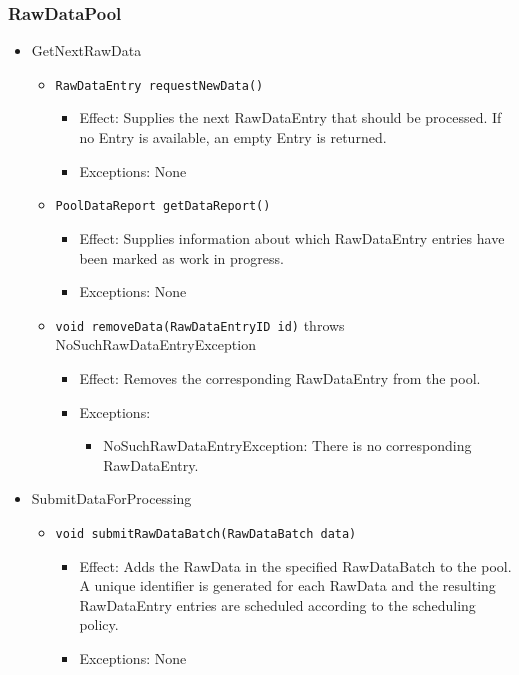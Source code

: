 \documentclass[a4paper,10pt]{article}
\begin{document}
\subsubsection*{RawDataPool}
\begin{itemize}
	\item GetNextRawData
	\begin{itemize}
		\item \texttt{RawDataEntry requestNewData()}
		\begin{itemize}
			\item Effect: Supplies the next RawDataEntry that should be processed. If no Entry is available, an empty Entry is returned.
			\item Exceptions: None
		\end{itemize}

		\item \texttt{PoolDataReport getDataReport()}
		\begin{itemize}
			\item Effect: Supplies information about which RawDataEntry entries have been marked as work in progress.
			\item Exceptions: None
		\end{itemize}

		\item \texttt{void removeData(RawDataEntryID id)} throws NoSuchRawDataEntryException
		\begin{itemize}
			\item Effect: Removes the corresponding RawDataEntry from the pool.
			\item Exceptions:
			\begin{itemize}
				\item NoSuchRawDataEntryException: There is no corresponding RawDataEntry.
			\end{itemize}
		\end{itemize}
	\end{itemize}
\end{itemize}

\begin{itemize}
	\item SubmitDataForProcessing
	\begin{itemize}
		\item \texttt{void submitRawDataBatch(RawDataBatch data)}
		\begin{itemize}
			\item Effect: Adds the RawData in the specified RawDataBatch to the pool. A unique identifier is generated for each RawData and the resulting RawDataEntry entries are scheduled according to the scheduling policy.
			\item Exceptions: None
		\end{itemize}
	\end{itemize}
\end{itemize}
\end{document}
